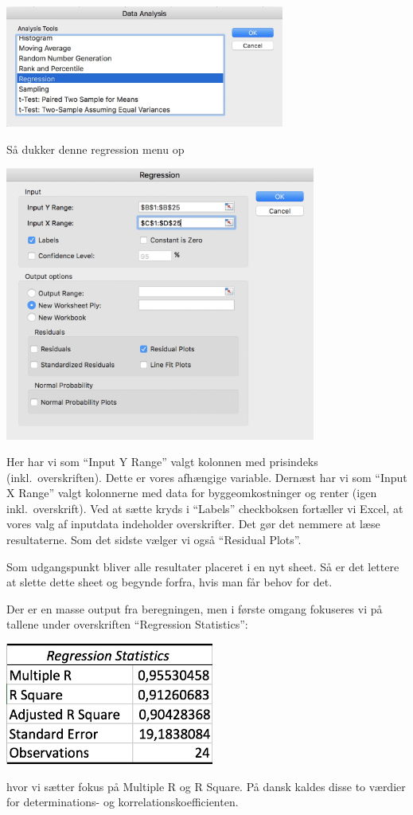 \begin{center}
\includegraphics[height=4cm]{analysisTools.JPG}
\end{center}
Så dukker denne regression menu op
\begin{center}
\includegraphics[height=9cm]{regression.JPG}
\end{center}
Her har vi som ``Input Y Range'' valgt kolonnen med prisindeks (inkl.\ overskriften). Dette er vores afhængige variable. Dernæst har vi som ``Input X Range'' valgt kolonnerne med data for byggeomkostninger og renter (igen inkl.\ overskrift). Ved at sætte kryds i ``Labels'' checkboksen fortæller vi Excel, at vores valg af inputdata indeholder overskrifter. Det gør det nemmere at læse resultaterne. Som det sidste vælger vi også ``Residual Plots''.

Som udgangspunkt bliver alle resultater placeret i en nyt sheet. Så er det lettere at slette dette sheet og begynde forfra, hvis man får behov for det.

Der er en masse output fra beregningen, men i første omgang fokuseres vi på tallene under overskriften ``Regression Statistics'':
\begin{center}
\includegraphics[height=4cm]{resultat.JPG}
\end{center}
hvor vi sætter fokus på Multiple R og R Square. På dansk kaldes disse to værdier for determinations- og korrelationskoefficienten.


